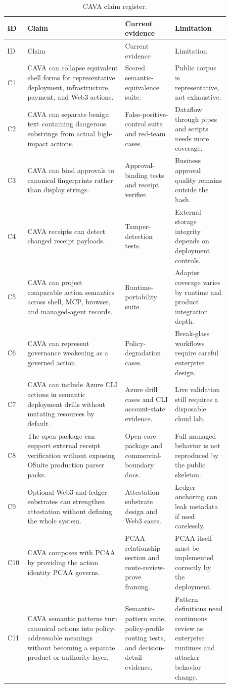 \documentclass[11pt]{article}
\begin{document}
\begin{longtable}{@{}L{0.07\linewidth}L{0.41\linewidth}L{0.21\linewidth}L{0.20\linewidth}@{}}
\caption{CAVA claim register.}
\label{tab:claim-register}\\
\toprule
ID & Claim & Current evidence & Limitation \\
\midrule
\endfirsthead
\toprule
ID & Claim & Current evidence & Limitation \\
\midrule
\endhead
C1 & CAVA can collapse equivalent shell forms for representative deployment, infrastructure, payment, and Web3 actions. & Scored semantic-equivalence suite. & Public corpus is representative, not exhaustive. \\
C2 & CAVA can separate benign text containing dangerous substrings from actual high-impact actions. & False-positive-control suite and red-team cases. & Dataflow through pipes and scripts needs more coverage. \\
C3 & CAVA can bind approvals to canonical fingerprints rather than display strings. & Approval-binding tests and receipt verifier. & Business approval quality remains outside the hash. \\
C4 & CAVA receipts can detect changed receipt payloads. & Tamper-detection tests. & External storage integrity depends on deployment controls. \\
C5 & CAVA can project comparable action semantics across shell, MCP, browser, and managed-agent records. & Runtime-portability suite. & Adapter coverage varies by runtime and product integration depth. \\
C6 & CAVA can represent governance weakening as a governed action. & Policy-degradation cases. & Break-glass workflows require careful enterprise design. \\
C7 & CAVA can include Azure CLI actions in semantic deployment drills without mutating resources by default. & Azure drill cases and CLI account-state evidence. & Live validation still requires a disposable cloud lab. \\
C8 & The open package can support external receipt verification without exposing OSuite production parser packs. & Open-core package and commercial-boundary docs. & Full managed behavior is not reproduced by the public skeleton. \\
C9 & Optional Web3 and ledger substrates can strengthen attestation without defining the whole system. & Attestation-substrate design and Web3 cases. & Ledger anchoring can leak metadata if used carelessly. \\
C10 & CAVA composes with PCAA by providing the action identity PCAA governs. & PCAA relationship section and route-review-prove framing. & PCAA itself must be implemented correctly by the deployment. \\
C11 & CAVA semantic patterns turn canonical actions into policy-addressable meanings without becoming a separate product or authority layer. & Semantic-pattern suite, policy-profile routing tests, and decision-detail evidence. & Pattern definitions need continuous review as enterprise runtimes and attacker behavior change. \\
\bottomrule
\end{longtable}
\end{document}

